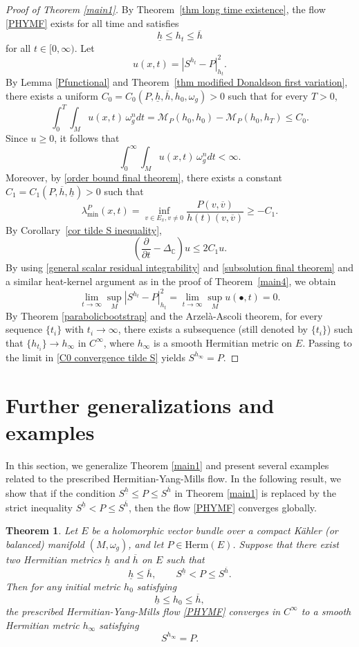 \documentclass[12pt, reqno]{amsart}
\newcommand\cM{{\mathcal M}}
\theoremstyle{plain}
\newtheorem{thm}{Theorem}[section]
\theoremstyle{definition}
\newcommand{\btheorem}{\begin{thm}}
\newcommand{\etheorem}{\end{thm}}
\newcommand{\bproof}{\begin{proof}}
\newcommand{\eproof}{\end{proof}}
\newcommand{\p}{\partial}
\renewcommand{\bar}{\overline}
\newcommand{\beq}{\begin{equation}}
\newcommand{\eeq}{\end{equation}}
\renewcommand{\>}{\rightarrow}
\newcommand{\C}{{\mathbb C}}
\renewcommand{\>}{\rightarrow}
\renewcommand{\p}{{\partial}}
\newcommand{\om}{\omega}
\renewcommand{\bar}{\overline}
\numberwithin{equation}{section} %
\begin{document}
\bproof[Proof of Theorem \ref{main1}]
By Theorem~\ref{thm long time existence}, the flow \eqref{PHYMF} exists for all time and satisfies
\beq
\underline h\leq h_t\leq \overline h
\label{order bound final theorem}
\eeq
for all $t\in[0, \infty)$.
Let
\beq
u(x,t)=|S^{h_t}-P|_{h_t}^2.
\eeq
By Lemma \ref{Pfunctional} and Theorem~\ref{thm modified Donaldson first variation}, there exists a uniform $C_0=C_0(P, \underline h, \overline h, h_0, \omega_g)>0$ such that for every $T>0$,
\beq
\int_0^T\int_M u(x,t)\,\om_g^n dt
=\cM_P(h_0,h_0)-\cM_P(h_0,h_T)
\leq C_0.
\eeq
Since $u\geq0$, it follows that
\beq
\int_0^\infty\int_M u(x,t)\,\om_g^n dt<\infty.
\label{general scalar residual integrability}
\eeq
Moreover,  by \eqref{order bound final theorem}, there exists a constant $C_1=C_1(P, \overline h, \underline h)>0$ such that \beq \lambda^P_{\min}(x,t)=\inf_{v \in E_x, v\neq 0}  \frac{ P(v, \bar v) }{h(t)(v,\bar v)}\geq-C_1.\eeq  By Corollary~\ref{cor tilde S inequality},
\beq
\left(\frac{\p}{\p t}-\Delta_\C\right)u\leq 2C_1u.
\label{subsolution final theorem}
\eeq
By using  \eqref{general scalar residual integrability} and \eqref{subsolution final theorem} and a similar heat-kernel argument as in the proof of Theorem~\ref{main4},  we obtain
\beq
\lim_{t\to\infty}\sup_M|S^{h_t}-P|^2_{h_t}
=\lim_{t\to\infty}\sup_M u(\bullet,t)=0.
\label{C0 convergence tilde S}
\eeq
By Theorem \ref{parabolicbootstrap} and the Arzel\`a-Ascoli theorem, for every sequence $\{t_i\}$ with $t_i\to\infty$, there exists a subsequence (still denoted by $\{t_i\}$) such that $\{h_{t_i}\}\to h_\infty$ in $C^\infty$, where $h_\infty$ is a  smooth Hermitian metric on $E$. Passing to the limit in \eqref{C0 convergence tilde S} yields $
S^{h_\infty}=P$.
\eproof




\baselineskip
\section{Further generalizations and examples}\label{more}


In this section, we generalize Theorem \ref{main1} and present several examples related to the prescribed Hermitian-Yang-Mills flow.
In the following result, we show that if the condition $S^{\underline h}\leq P\leq S^{\overline h}$ in Theorem \ref{main1} is replaced by the strict inequality $S^{\underline h}<P\leq S^{\overline h}$, then the flow  \eqref{PHYMF} converges globally.

\btheorem\label{prop strict lower whole convergence}
Let $E$ be a holomorphic vector bundle over a compact K\"ahler (or balanced) manifold $(M,\om_g)$, and let $P\in \mathrm{Herm}(E)$. Suppose that there exist two Hermitian metrics $\underline h$ and $\overline h$ on $E$ such that
\beq
\underline h\leq \overline h,
\qquad
S^{\underline h}<P\leq S^{\overline h}.
\label{strict lower proposition assumption}
\eeq
Then for any initial metric $h_0$ satisfying
\beq
\underline h\leq h_0\leq \overline h,
\eeq
the prescribed Hermitian-Yang-Mills flow \eqref{PHYMF} converges in $C^\infty$ to a smooth Hermitian metric $h_\infty$ satisfying
\beq
S^{h_\infty}=P.
\eeq
\etheorem
\end{document}
